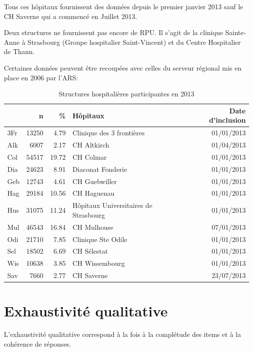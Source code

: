 \documentclass[12pt,english,french,twoside]{report}\usepackage[]{graphicx}\usepackage[]{color}
\begin{document}
Tous ces hôpitaux fournissent des données depuis le premier janvier 2013 sauf le CH Saverne qui a commencé en Juillet 2013.

Deux structures ne fournissent pas encore de RPU. Il s'agit de la clinique Sainte-Anne à Strasbourg (Groupe hospitalier Saint-Vincent) et du Centre Hospitalier de Thann.

Certaines données peuvent être recoupées avec celles du serveur régional mis en place en 2006 par l'ARS: 


\begin{table}[ht]
\centering
\begin{tabular}{|l|r|r|l|r|}
  \hline
 & n & \% & Hôpitaux & Date d'inclusion \\ 
  \hline
3Fr & 13250 & 4.79 & Clinique des 3 frontières & 01/01/2013 \\ 
  Alk & 6007 & 2.17 & CH Altkirch & 01/04/2013 \\ 
  Col & 54517 & 19.72 & CH Colmar & 01/01/2013 \\ 
  Dia & 24623 & 8.91 & Diaconat Fonderie & 01/01/2013 \\ 
  Geb & 12743 & 4.61 & CH Guebwiller & 01/01/2013 \\ 
  Hag & 29184 & 10.56 & CH Haguenau & 01/01/2013 \\ 
  Hus & 31075 & 11.24 & Hôpitaux Universitaires de Strasbourg & 01/01/2013 \\ 
  Mul & 46543 & 16.84 & CH Mulhouse & 07/01/2013 \\ 
  Odi & 21710 & 7.85 & Clinique Ste Odile & 01/01/2013 \\ 
  Sel & 18502 & 6.69 & CH Sélestat & 01/01/2013 \\ 
  Wis & 10638 & 3.85 & CH Wissembourg & 01/01/2013 \\ 
  Sav & 7660 & 2.77 & CH Saverne & 23/07/2013 \\ 
   \hline
\end{tabular}
\caption{Structures hospitalières participantes en 2013} 
\label{tab1}
\end{table}



\section{Exhaustivité qualitative}

L'exhaustivité qualitative correspond à la fois à la complétude des items et à la cohérence de réponses.
\end{document}

